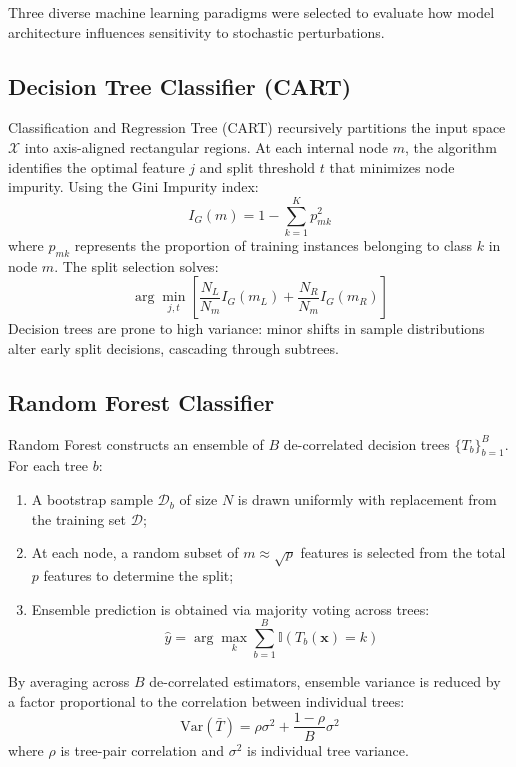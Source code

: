 Three diverse machine learning paradigms were selected to evaluate how model architecture influences sensitivity to stochastic perturbations.

\subsection{Decision Tree Classifier (CART)}
Classification and Regression Tree (CART) recursively partitions the input space $\mathcal{X}$ into axis-aligned rectangular regions. At each internal node $m$, the algorithm identifies the optimal feature $j$ and split threshold $t$ that minimizes node impurity. Using the Gini Impurity index:
\begin{equation}
    I_G(m) = 1 - \sum_{k=1}^{K} p_{mk}^2
\end{equation}
where $p_{mk}$ represents the proportion of training instances belonging to class $k$ in node $m$. The split selection solves:
\begin{equation}
    \arg\min_{j, t} \left[ \frac{N_L}{N_m} I_G(m_L) + \frac{N_R}{N_m} I_G(m_R) \right]
\end{equation}
Decision trees are prone to high variance: minor shifts in sample distributions alter early split decisions, cascading through subtrees.

\subsection{Random Forest Classifier}
Random Forest constructs an ensemble of $B$ de-correlated decision trees $\{T_b\}_{b=1}^B$. For each tree $b$:
\begin{enumerate}
    \item A bootstrap sample $\mathcal{D}_b$ of size $N$ is drawn uniformly with replacement from the training set $\mathcal{D}$;
    \item At each node, a random subset of $m \approx \sqrt{p}$ features is selected from the total $p$ features to determine the split;
    \item Ensemble prediction is obtained via majority voting across trees:
    \begin{equation}
        \hat{y} = \arg\max_k \sum_{b=1}^{B} \mathbb{I}(T_b(\mathbf{x}) = k)
    \end{equation}
\end{enumerate}
By averaging across $B$ de-correlated estimators, ensemble variance is reduced by a factor proportional to the correlation between individual trees:
\begin{equation}
    \text{Var}(\bar{T}) = \rho \sigma^2 + \frac{1 - \rho}{B} \sigma^2
\end{equation}
where $\rho$ is tree-pair correlation and $\sigma^2$ is individual tree variance.

